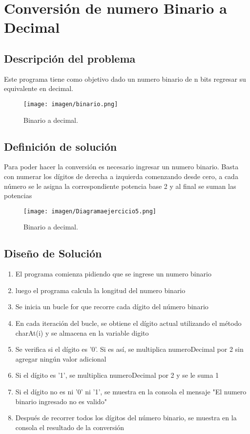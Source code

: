 \section{Conversión de numero Binario a Decimal}

\subsection{Descripción del problema}
Este programa tiene como objetivo dado un numero binario de n bits regresar su equivalente en decimal.

\begin {figure}[h!]
\centerline{\texttt{[image: imagen/binario.png]}}
\caption{Binario a decimal.}
\label{fig}
\end {figure}


\subsection{Definición  de solución}
Para poder hacer la conversión es necesario ingresar un numero binario. Basta con numerar los dígitos de derecha a izquierda comenzando desde cero, a cada número se le asigna la correspondiente potencia base 2 y al final se suman las potencias\cite{articuloBinario} 

\begin {figure}[h!]
\centerline{\texttt{[image: imagen/Diagramaejercicio5.png]}}
\caption{Binario a decimal.}
\label{fig}
\end {figure}



\subsection{Diseño de Solución}

\begin{enumerate}
  \item El programa comienza pidiendo que se ingrese un numero binario
  \item luego el programa calcula la longitud del numero binario
  \item Se inicia un bucle for que recorre cada dígito del número binario
  \item En cada iteración del bucle, se obtiene el dígito actual utilizando el método charAt(i) y se almacena en la variable digito
  \item Se verifica si el dígito es '0'. Si es así, se multiplica numeroDecimal por 2 sin agregar ningún valor adicional
  \item Si el dígito es '1', se multiplica numeroDecimal por 2 y se le suma 1
  \item Si el dígito no es ni '0' ni '1', se muestra en la consola el mensaje "El numero binario ingresado no es valido"
  \item Después de recorrer todos los dígitos del número binario, se muestra en la consola el resultado de la conversión
  
\end{enumerate}


